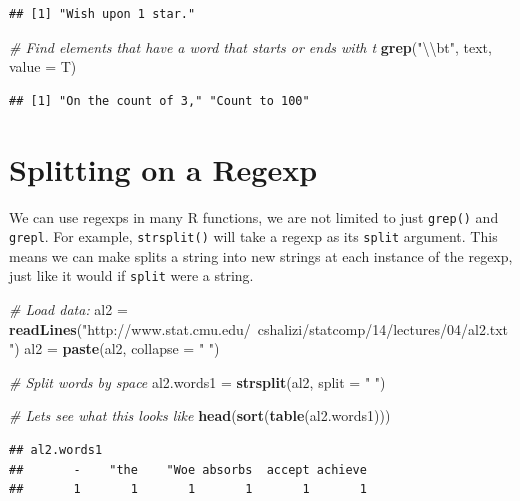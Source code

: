 \documentclass[
]{book}
\newenvironment{Shaded}{\begin{snugshade}}{\end{snugshade}}
\newcommand{\CharTok}[1]{\textcolor[rgb]{0.31,0.60,0.02}{#1}}
\newcommand{\CommentTok}[1]{\textcolor[rgb]{0.56,0.35,0.01}{\textit{#1}}}
\newcommand{\DataTypeTok}[1]{\textcolor[rgb]{0.13,0.29,0.53}{#1}}
\newcommand{\KeywordTok}[1]{\textcolor[rgb]{0.13,0.29,0.53}{\textbf{#1}}}
\newcommand{\NormalTok}[1]{#1}
\newcommand{\StringTok}[1]{\textcolor[rgb]{0.31,0.60,0.02}{#1}}
\begin{document}
\begin{verbatim}
## [1] "Wish upon 1 star."
\end{verbatim}

\begin{Shaded}
\begin{Highlighting}[]
\CommentTok{# Find elements that have a word that starts or ends with t}
\KeywordTok{grep}\NormalTok{(}\StringTok{"}\CharTok{\textbackslash{}\textbackslash{}}\StringTok{bt"}\NormalTok{, text, }\DataTypeTok{value =}\NormalTok{ T)}
\end{Highlighting}
\end{Shaded}

\begin{verbatim}
## [1] "On the count of 3," "Count to 100"
\end{verbatim}

\hypertarget{splitting-on-a-regexp}{%
\section{Splitting on a Regexp}\label{splitting-on-a-regexp}}

We can use regexps in many R functions, we are not limited to just \texttt{grep()} and \texttt{grepl}. For example, \texttt{strsplit()} will take a regexp as its \texttt{split} argument. This means we can make splits a string into new strings at each instance of the regexp, just like it would if \texttt{split} were a string.

\begin{Shaded}
\begin{Highlighting}[]
\CommentTok{# Load data:}
\NormalTok{al2 =}\StringTok{ }\KeywordTok{readLines}\NormalTok{(}\StringTok{"http://www.stat.cmu.edu/~cshalizi/statcomp/14/lectures/04/al2.txt"}\NormalTok{)}
\NormalTok{al2 =}\StringTok{ }\KeywordTok{paste}\NormalTok{(al2, }\DataTypeTok{collapse =} \StringTok{" "}\NormalTok{)}

\CommentTok{# Split words by space}
\NormalTok{al2.words1 =}\StringTok{ }\KeywordTok{strsplit}\NormalTok{(al2, }\DataTypeTok{split =} \StringTok{" "}\NormalTok{)}

\CommentTok{# Lets see what this looks like}
\KeywordTok{head}\NormalTok{(}\KeywordTok{sort}\NormalTok{(}\KeywordTok{table}\NormalTok{(al2.words1)))}
\end{Highlighting}
\end{Shaded}

\begin{verbatim}
## al2.words1
##       -    "the    "Woe absorbs  accept achieve 
##       1       1       1       1       1       1
\end{verbatim}
\end{document}

